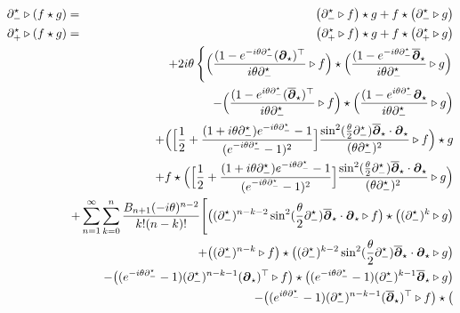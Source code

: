 \begin{eqnarray}
  \label{WeylLeibniz}
  \d_-^\star\triangleright(f\star g)&=&\left(\d_-^\star
    \triangleright f\right)\star g+f\star\left(\d_-^\star
\triangleright g\right) \\\nn
\d_+^\star\triangleright (f\star g)&=&\left(\d_+^\star
\triangleright f\right)\star g+f\star\left(\d_+^\star
\triangleright g\right) \\\nn
&&+ 2 i\theta\left\{
\Bigl( \frac{(1- e^{- i\theta \d_-^\star} 
(\bfd_\star)^\top}{ i\theta \d_-^\star} \triangleright f
\Bigr) \star \Bigl( \frac{(1- e^{- i\theta \d_-^\star} 
\overline{\bfd}_\star}{ i\theta \d_-^\star} \triangleright
g\Bigr)\right. \\\nn && \qquad\qquad
- \Bigl( \frac{(1- e^{ i\theta 
\d_-^\star} ( \overline{\bfd}_\star)^\top}
{ i\theta \d_-^\star} \triangleright f
\Bigr) \star \Bigl( \frac{(1- e^{ i\theta \d_-^\star} 
\bfd_\star}{ i\theta \d_-^\star} \triangleright
g\Bigr)\\\nn &&\qquad\qquad
+ \Bigl( \Bigl[\frac12+\frac{(1+ i\theta 
\d_-^\star)  e^{- i\theta \d_-^\star}-1}{( e^{- i\theta 
\d_-^\star}-1)^2}\Bigr] \frac{\sin^2(\frac\theta2 \d_-^\star) 
\overline{\bfd}_\star\cdot\bfd_\star}{(\theta \d_-^\star)^2} 
\triangleright f\Bigr) \star g\\\nn &&\qquad\qquad+ f \star 
\Bigl( \Bigl[\frac12+\frac{(1+ i\theta 
\d_-^\star)  e^{- i\theta \d_-^\star}-1}{( e^{- i\theta 
\d_-^\star}-1)^2}\Bigr] \frac{\sin^2(\frac\theta2 \d_-^\star) 
\overline{\bfd}_\star\cdot\bfd_\star}{(\theta \d_-^\star)^2} 
\triangleright g\Bigr) \\\nn && \hspace{-20pt}+ \sum_{n=1}^\infty 
\sum_{k=0}^n \frac{B_{n+1} (- i\theta)^{n-2}}{k! (n-k)!} 
\Biggl[\bigl((\d_-^\star)^{n-k-2} \sin^2( \frac\theta2  
\d_-^\star) \overline{\bfd}_\star\cdot\bfd_\star
\triangleright f\bigr) \star \bigl((\d_-^\star)^k
\triangleright g\bigr)\\\nn && \quad + 
\bigl((\d_-^\star)^{n-k}\triangleright
f\bigr) \star \bigl((\d_-^\star)^{k-2} \sin^2( \frac\theta2  
\d_-^\star) \overline{\bfd}_\star\cdot\bfd_\star
\triangleright g\bigr) \\\nn && \quad - 
\bigl(( e^{- i\theta \d_-^\star}-1) (\d_-^\star)^{n-k-1}
 (\bfd_\star)^\top\triangleright f\bigr) \star \bigl(
( e^{- i\theta \d_-^\star}-1) (\d_-^\star)^{k-1}
 \overline{\bfd}_\star\triangleright g\bigr) \\\nn &&
\quad -
\bigl(( e^{ i\theta \d_-^\star}-1) (\d_-^\star)^{n-k-1}
 ( \overline{\bfd}_\star)^\top\triangleright f\bigr) \star \bigl(

\end{eqnarray}
